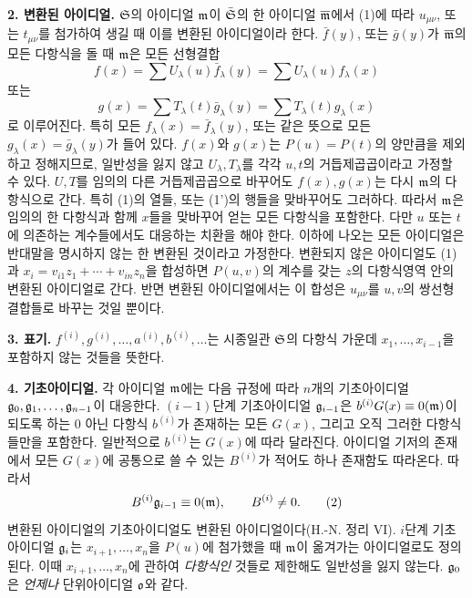 \textbf{2. 변환된 아이디얼.} \(\mathfrak S\)의 아이디얼 \(\mathfrak m\)이 \(\bar{\mathfrak S}\)의 한 아이디얼 \(\overline{\mathfrak m}\)에서 (1)에 따라 \(u_{\mu\nu}\), 또는 \(t_{\mu\nu}\)를 첨가하여 생길 때 이를 변환된 아이디얼이라 한다. \(\bar f(y)\), 또는 \(\bar g(y)\)가 \(\overline{\mathfrak m}\)의 모든 다항식을 돌 때 \(\mathfrak m\)은 모든 선형결합
\[
 f(x)=\sum U_\lambda(u)\bar f_\lambda(y)=\sum U_\lambda(u)f_\lambda(x)
\]
또는
\[
 g(x)=\sum T_\lambda(t)\bar g_\lambda(y)=\sum T_\lambda(t)g_\lambda(x)
\]
로 이루어진다. 특히 모든 \(f_\lambda(x)=\bar f_\lambda(y)\), 또는 같은 뜻으로 모든 \(g_\lambda(x)=\bar g_\lambda(y)\)가 들어 있다. \(f(x)\)와 \(g(x)\)는 \(P(u)=P(t)\)의 양만큼을 제외하고 정해지므로, 일반성을 잃지 않고 \(U_\lambda,T_\lambda\)를 각각 \(u,t\)의 거듭제곱곱이라고 가정할 수 있다. \(U,T\)를 임의의 다른 거듭제곱곱으로 바꾸어도 \(f(x),g(x)\)는 다시 \(\mathfrak m\)의 다항식으로 간다. 특히 (1)의 열들, 또는 (1')의 행들을 맞바꾸어도 그러하다. 따라서 \(\mathfrak m\)은 임의의 한 다항식과 함께 \(x\)들을 맞바꾸어 얻는 모든 다항식을 포함한다. 다만 \(u\) 또는 \(t\)에 의존하는 계수들에서도 대응하는 치환을 해야 한다. 이하에 나오는 모든 아이디얼은 반대말을 명시하지 않는 한 변환된 것이라고 가정한다. 변환되지 않은 아이디얼도 (1)과 \(x_i=v_{i1}z_1+\cdots+v_{in}z_n\)을 합성하면 \(P(u,v)\)의 계수를 갖는 \(z\)의 다항식영역 안의 변환된 아이디얼로 간다. 반면 변환된 아이디얼에서는 이 합성은 \(u_{\mu\nu}\)를 \(u,v\)의 쌍선형 결합들로 바꾸는 것일 뿐이다.

\textbf{3. 표기.} \(f^{(i)},g^{(i)},\ldots,a^{(i)},b^{(i)},\ldots\)는 시종일관 \(\mathfrak S\)의 다항식 가운데 \(x_1,\ldots,x_{i-1}\)을 포함하지 않는 것들을 뜻한다.

\textbf{4. 기초아이디얼.} 각 아이디얼 \(\mathfrak m\)에는 다음 규정에 따라 \(n\)개의 기초아이디얼 \(\mathfrak g_0,\mathfrak g_1,\ldots,\mathfrak g_{n-1}\)이 대응한다. \((i-1)\)단계 기초아이디얼 \(\mathfrak g_{i-1}\)은 \(b^{(i)}G(x)\equiv0(\mathfrak m)\)이 되도록 하는 0 아닌 다항식 \(b^{(i)}\)가 존재하는 모든 \(G(x)\), 그리고 오직 그러한 다항식들만을 포함한다. 일반적으로 \(b^{(i)}\)는 \(G(x)\)에 따라 달라진다. 아이디얼 기저의 존재에서 모든 \(G(x)\)에 공통으로 쓸 수 있는 \(B^{(i)}\)가 적어도 하나 존재함도 따라온다. 따라서
\begin{equation}
 B^{(i)}\mathfrak g_{i-1}\equiv0(\mathfrak m),\qquad B^{(i)}\ne0 . \tag{2}
\end{equation}
변환된 아이디얼의 기초아이디얼도 변환된 아이디얼이다(H.-N. 정리 VI). \(i\)단계 기초아이디얼 \(\mathfrak g_i\)는 \(x_{i+1},\ldots,x_n\)을 \(P(u)\)에 첨가했을 때 \(\mathfrak m\)이 옮겨가는 아이디얼로도 정의된다. 이때 \(x_{i+1},\ldots,x_n\)에 관하여 \emph{다항식인} 것들로 제한해도 일반성을 잃지 않는다. \(\mathfrak g_0\)은 \emph{언제나} 단위아이디얼 \(\mathfrak o\)와 같다.

